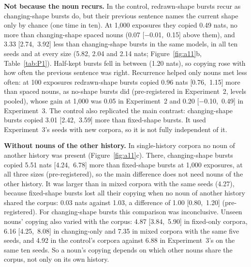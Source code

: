 \documentclass{article}
\begin{document}
\textbf{Not because the noun recurs.} In the control, redrawn-shape bursts recur as changing-shape bursts do, but their previous sentence names the current shape only by chance (one time in ten). At 1,000 exposures they copied 0.49 nats, no more than changing-shape spaced nouns (0.07 [$-$0.01,~0.15] above them), and 3.33 [2.74,~3.92] less than changing-shape bursts in the same models, in all ten seeds and at every size (5.82, 2.04 and 2.14 nats; Figure~\ref{fig:a11}b, Table~\ref{tab:P1}). Half-kept bursts fell in between (1.20 nats), so copying rose with how often the previous sentence was right. Recurrence helped only nouns met less often: at 100 exposures redrawn-shape bursts copied 0.96 nats [0.76,~1.15] more than spaced nouns, as no-shape bursts did (pre-registered in Experiment~2, levels pooled), whose gain at 1,000 was 0.05 in Experiment~2 and 0.20 [$-$0.10,~0.49] in Experiment~3. The control also replicated the main contrast: changing-shape bursts copied 3.01 [2.42,~3.59] more than fixed-shape bursts. It used Experiment~3's seeds with new corpora, so it is not fully independent of it.

\begin{table}[!t]
\centering\small


\caption{Control: copy score by condition and paired differences (nats; seed-level means over ten seeds, sizes averaged within seed; t-based 95\% intervals).}
\label{tab:P1}
\end{table}

\textbf{Without nouns of the other history.} In single-history corpora no noun of another history was present (Figure~\ref{fig:a11}c). There, changing-shape bursts copied 5.51 nats [4.24,~6.78] more than fixed-shape bursts at 1,000 exposures, at all three sizes (pre-registered), so the main difference does not need nouns of the other history. It was larger than in mixed corpora with the same seeds (4.27), because fixed-shape bursts lost all their copying when no noun of another history shared the corpus: 0.03 nats against 1.03, a difference of 1.00 [0.80,~1.20] (pre-registered). For changing-shape bursts this comparison was inconclusive. Unseen nouns' copying also varied with the corpus: 4.87 [3.84,~5.90] in fixed-only corpora, 6.16 [4.25,~8.08] in changing-only and 7.35 in mixed corpora with the same five seeds, and 4.92 in the control's corpora against 6.88 in Experiment~3's on the same ten seeds. So a noun's copying depends on which other nouns share the corpus, not only on its own history.
\end{document}
